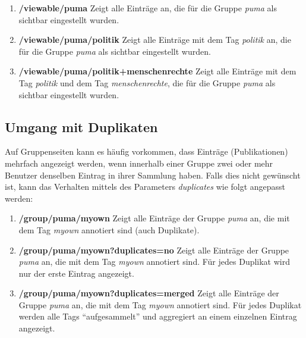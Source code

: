 \begin{enumerate}
    \item \textbf{/viewable/puma} \newline
    Zeigt alle Einträge an, die für die Gruppe \textit{puma} als sichtbar eingestellt wurden.
    \item \textbf{/viewable/puma/politik} \newline
    Zeigt alle Einträge mit dem Tag \textit{politik} an, die für die Gruppe \textit{puma} als sichtbar eingestellt wurden.
    \item \textbf{/viewable/puma/politik+menschenrechte} \newline
    Zeigt alle Einträge mit dem Tag \textit{politik} und dem Tag \textit{menschenrechte}, die für die Gruppe \textit{puma} als sichtbar eingestellt wurden.
\end{enumerate}
\subsection{Umgang mit Duplikaten}
\label{subsec:duplikate}
Auf Gruppenseiten kann es häufig vorkommen, dass Einträge (Publikationen) mehrfach angezeigt werden, wenn innerhalb einer Gruppe zwei oder mehr Benutzer denselben Eintrag in ihrer Sammlung haben.\newline
Falls dies nicht gewünscht ist, kann das Verhalten mittels des Parameters \textit{duplicates} wie folgt angepasst werden:
\begin{enumerate}
    \item \textbf{/group/puma/myown} \newline
    Zeigt alle Einträge der Gruppe \textit{puma} an, die mit dem Tag \textit{myown} annotiert sind (auch Duplikate).
    \item \textbf{/group/puma/myown?duplicates=no} \newline
    Zeigt alle Einträge der Gruppe \textit{puma} an, die mit dem Tag \textit{myown} annotiert sind. Für jedes Duplikat wird nur der erste Eintrag angezeigt.
    \item \textbf{/group/puma/myown?duplicates=merged} \newline
    Zeigt alle Einträge der Gruppe \textit{puma} an, die mit dem Tag \textit{myown} annotiert sind. Für jedes Duplikat werden alle Tags \enquote{aufgesammelt} und aggregiert an einem einzelnen Eintrag angezeigt.
\end{enumerate}


